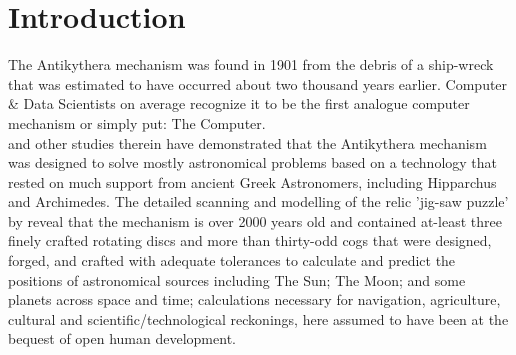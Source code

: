 \documentclass[final,5p,times,twocolumn,authoryear]{elsarticle}
\begin{document}


    

\section{Introduction}
\label{sec:intro}
%
 The Antikythera mechanism was found in 1901 from the debris of a ship-wreck that was estimated to have occurred about two thousand years earlier. Computer \& Data Scientists on average recognize it to be the first analogue computer mechanism or simply put: The Computer.\\ \citet{Freeth2021} and other studies therein have demonstrated that the Antikythera mechanism was designed to solve mostly astronomical problems based on a technology that rested on much support from ancient Greek Astronomers, including Hipparchus and Archimedes. The detailed scanning and modelling of the relic 'jig-saw puzzle' by \citet{Freeth2021} reveal that the mechanism is over 2000 years old and contained at-least three finely crafted rotating discs and more than thirty-odd cogs that were designed, forged, and crafted with adequate tolerances to calculate and predict the positions of astronomical sources including The Sun; The Moon; and some planets across space and time; calculations necessary for navigation, agriculture, cultural and scientific/technological reckonings, here assumed to have been at the bequest of open human development.
 
\end{document}
